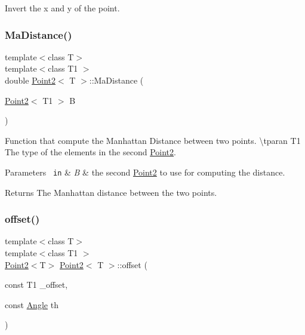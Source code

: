 Invert the x and y of the point. 

\mbox{\label{class_point2_a10a4aa3d7939b1675f4bd18b8f9f0ead}} 
\subsubsection{\texorpdfstring{MaDistance()}{MaDistance()}}
{\footnotesize\ttfamily template$<$class T$>$ \\
template$<$class T1 $>$ \\
double \mbox{\hyperlink{class_point2}{Point2}}$<$ T $>$\+::Ma\+Distance (\begin{DoxyParamCaption}\item[{\mbox{\hyperlink{class_point2}{Point2}}$<$ T1 $>$}]{B }\end{DoxyParamCaption})\hspace{0.3cm}{\ttfamily [inline]}}



Function that compute the Manhattan Distance between two points. \textbackslash{}tparan T1 The type of the elements in the second {\ttfamily \mbox{\hyperlink{class_point2}{Point2}}}. 


\begin{DoxyParams}[1]{Parameters}
\mbox{\texttt{ in}}  & {\em B} & the second {\ttfamily \mbox{\hyperlink{class_point2}{Point2}}} to use for computing the distance. \\
\hline
\end{DoxyParams}
\begin{DoxyReturn}{Returns}
The Manhattan distance between the two points. 
\end{DoxyReturn}
\mbox{\label{class_point2_a1c49ae936487b2f7b72682ba97eed1cb}} 
\subsubsection{\texorpdfstring{offset()}{offset()}\hspace{0.1cm}{\footnotesize\ttfamily [1/3]}}
{\footnotesize\ttfamily template$<$class T$>$ \\
template$<$class T1 $>$ \\
\mbox{\hyperlink{class_point2}{Point2}}$<$T$>$ \mbox{\hyperlink{class_point2}{Point2}}$<$ T $>$\+::offset (\begin{DoxyParamCaption}\item[{const T1}]{\+\_\+offset,  }\item[{const \mbox{\hyperlink{class_angle}{Angle}}}]{th }\end{DoxyParamCaption})\hspace{0.3cm}{\ttfamily [inline]}}



